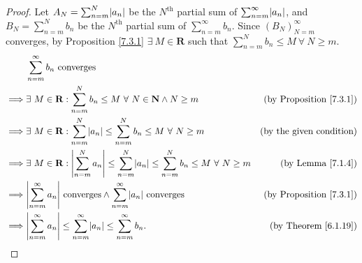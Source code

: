 \begin{proof}
Let \(A_N = \sum_{n = m}^N \abs*{a_n}\) be the \(N^\text{th}\) partial sum of \(\sum_{n = m}^\infty \abs*{a_n}\), and \(B_N = \sum_{n = m}^N b_n\) be the \(N^\text{th}\) partial sum of \(\sum_{n = m}^\infty b_n\).
Since \((B_N)_{N = m}^\infty\) converges, by Proposition \ref{7.3.1} \(\exists\ M \in \mathbf{R}\) such that \(\sum_{n = m}^N b_n \leq M \ \forall\ N \geq m\).
\begin{align*}
& \sum_{n = m}^\infty b_n \text{ converges} \\
\implies & \exists\ M \in \mathbf{R} : \sum_{n = m}^N b_n \leq M \ \forall\ N \in \mathbf{N} \land N \geq m & \text{(by Proposition \ref{7.3.1})} \\
\implies & \exists\ M \in \mathbf{R} : \sum_{n = m}^N \abs*{a_n} \leq \sum_{n = m}^N b_n \leq M \ \forall\ N \geq m & \text{(by the given condition)} \\
\implies & \exists\ M \in \mathbf{R} : \abs*{\sum_{n = m}^N a_n} \leq \sum_{n = m}^N \abs*{a_n} \leq \sum_{n = m}^N b_n \leq M \ \forall\ N \geq m & \text{(by Lemma \ref{7.1.4})} \\
\implies & \abs*{\sum_{n = m}^\infty a_n} \text{ converges} \land \sum_{n = m}^\infty \abs*{a_n} \text{ converges} & \text{(by Proposition \ref{7.3.1})} \\
\implies & \abs*{\sum_{n = m}^\infty a_n} \leq \sum_{n = m}^\infty \abs*{a_n} \leq \sum_{n = m}^\infty b_n. & \text{(by Theorem \ref{6.1.19})}
\end{align*}
\end{proof}